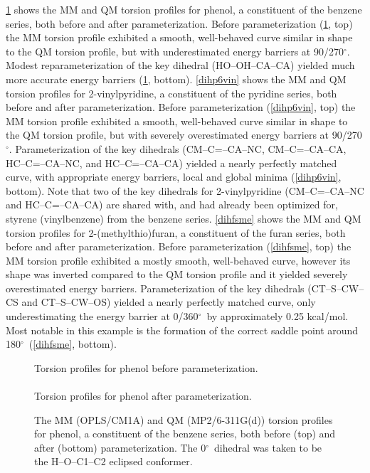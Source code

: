 \documentclass[12pt]{report}
\def\deg{$^{\circ}$}
\begin{document}
\cref{dihphoh} shows the MM and QM torsion profiles for phenol, a constituent of the benzene series, both before and after parameterization. Before parameterization (\cref{dihphoh}, top) the MM torsion profile exhibited a smooth, well-behaved curve similar in shape to the QM torsion profile, but with underestimated energy barriers at 90/270\deg. Modest reparameterization of the key dihedral (HO--OH--CA--CA) yielded much more accurate energy barriers (\cref{dihphoh}, bottom). \cref{dihp6vin} shows the MM and QM torsion profiles for 2-vinylpyridine, a constituent of the pyridine series, both before and after parameterization. Before parameterization (\cref{dihp6vin}, top) the MM torsion profile exhibited a smooth, well-behaved curve similar in shape to the QM torsion profile, but with severely overestimated energy barriers at 90/270\deg. Parameterization of the key dihedrals (CM--C=--CA--NC, CM--C=--CA--CA, HC--C=--CA--NC, and HC--C=--CA--CA) yielded a nearly perfectly matched curve, with appropriate energy barriers, local and global minima (\cref{dihp6vin}, bottom). Note that two of the key dihedrals for 2-vinylpyridine (CM--C=--CA--NC and HC--C=--CA--CA) are shared with, and had already been optimized for, styrene (vinylbenzene) from the benzene series. \cref{dihfsme} shows the MM and QM torsion profiles for 2-(methylthio)furan, a constituent of the furan series, both before and after parameterization. Before parameterization (\cref{dihfsme}, top) the MM torsion profile exhibited a mostly smooth, well-behaved curve, however its shape was inverted compared to the QM torsion profile and it yielded severely overestimated energy barriers. Parameterization of the key dihedrals (CT--S--CW--CS and CT--S--CW--OS) yielded a nearly perfectly matched curve, only underestimating the energy barrier at 0/360\deg\ by approximately 0.25 kcal/mol. Most notable in this example is the formation of the correct saddle point around 180\deg\ (\cref{dihfsme}, bottom).

\begin{figure}[htbp]
\centering
Torsion profiles for phenol before parameterization.\\
\\
Torsion profiles for phenol after parameterization.\\

\caption{The MM (OPLS/CM1A) and QM (MP2/6-311G(d)) torsion profiles for phenol, a constituent of the benzene series, both before (top) and after (bottom) parameterization. The 0\deg\ dihedral was taken to be the H--O--C1--C2 eclipsed conformer.}
\label{dihphoh}
\end{figure}
\end{document}
